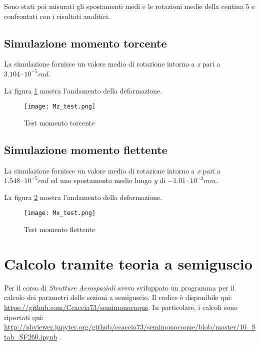 \documentclass[
10pt, %
a4paper, %
oneside, %
headinclude,footinclude, %
BCOR5mm, %
]{scrartcl}
\begin{document}
Sono stati poi misurati gli spostamenti medi e le rotazioni medie della centina 5 e confrontati con i risultati analitici.

\subsection{Simulazione momento torcente}

La simulazione fornisce un valore medio di rotazione intorno a \emph{z} pari a $3.104\cdot 10^{-5} rad$.

La figura \ref{fig:Mztest} mostra l'andamento della deformazione.

\begin{figure}[htb]
	\centering 
	\texttt{[image: Mz\_test.png]} 
	\caption[Test Mz]{Test momento torcente} %
	\label{fig:Mztest} 
\end{figure}



\subsection{Simulazione momento flettente}

La simulazione fornisce un valore medio di rotazione intorno a \emph{x} pari a $1.548\cdot 10^{-5} rad$ ed uno spostamento medio lungo \emph{y} di $-1.01 \cdot 10^{-2}mm$.

La figura \ref{fig:Mxtest} mostra l'andamento della deformazione.

\begin{figure}[htb]
	\centering 
	\texttt{[image: Mx\_test.png]} 
	\caption[Test Mx]{Test momento flettente} %
	\label{fig:Mxtest} 
\end{figure}


\section{Calcolo tramite teoria a semiguscio}

Per il corso di \emph{Strutture Aerospaziali} avevo sviluppato un programma per il calcolo dei parametri delle sezioni a semiguscio. Il codice è disponibile qui: \url{https://github.com/Ccaccia73/semimonocoque}. In particolare, i calcoli sono riportati qui: \url{http://nbviewer.jupyter.org/github/ccaccia73/semimonocoque/blob/master/10_Stab_SF260.ipynb} .
\end{document}
